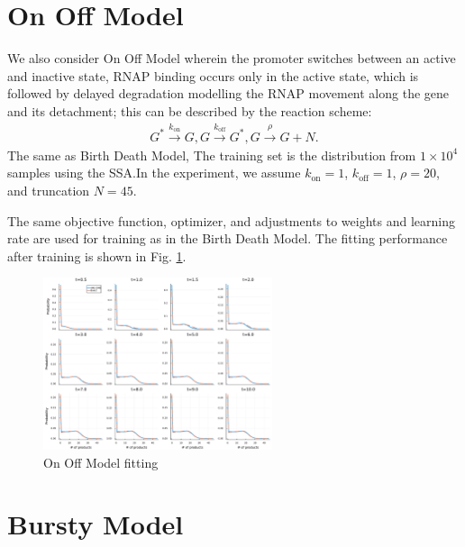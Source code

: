 \documentclass[a4paper,10pt]{article}
\begin{document}
\section{On Off Model}
We also consider On Off Model wherein the promoter switches between an active and inactive state, RNAP binding occurs only in the active state, which is followed by delayed degradation modelling the RNAP movement along the gene and its detachment; this can be described by the reaction scheme:
\begin{equation}\label{on-off}
	\begin{aligned}
	G^*\xrightarrow{k_{\text{on}}} G,
	G\xrightarrow{k_{\text{off}}}G^*,
	G\xrightarrow{\rho}G+N.
	\end{aligned}
\end{equation}
The same as Birth Death Model, The training set is the distribution from $1 \times 10^4$ samples using the SSA.In the experiment, we assume $k_{\text{on}}=1$, $k_{\text{off}}=1$, $\rho=20$, and truncation $N=45$.

The same objective function, optimizer, and adjustments to weights and learning rate are used for training as in the Birth Death Model. The fitting performance after training is shown in Fig. \ref{On Off Model fitting}. 

\begin{figure}[h]
	\centering
	\includegraphics[width=0.6\textwidth]{Figs/On_Off_fitting.pdf}
	\caption{On Off Model fitting}\label{On Off Model fitting}  
\end{figure}

\section{Bursty Model}
\end{document}

